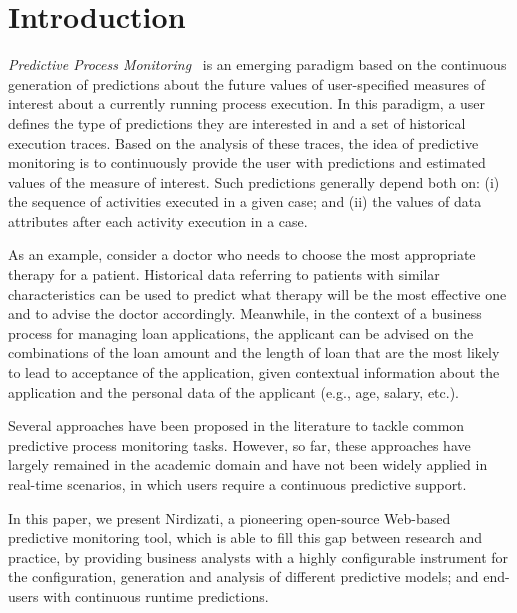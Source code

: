 \documentclass[runningheads,a4paper]{llncs}
\begin{document}
\section{Introduction} \label{sec:intro}
\emph{Predictive Process Monitoring}~\cite{PredictiveMonitoring} is an emerging paradigm based on the continuous generation of predictions about the future values of user-specified measures of interest about a currently running process execution.
In this paradigm, a user defines the type of predictions they are interested in and a set of historical execution traces. Based on the analysis of these traces, the idea of predictive monitoring is to continuously provide the user with predictions and estimated values of the measure of interest. Such predictions generally depend both on: (i) the sequence of activities executed in a given case; and (ii) the values of data attributes after each activity execution in a case.

As an example, consider a doctor who needs to choose the most appropriate therapy for a patient. Historical data referring to patients with similar characteristics can be used to predict what therapy will be the most effective one and to advise the doctor accordingly. Meanwhile, in the context of a business process for managing loan applications, the applicant can be advised on the combinations of the loan amount and the length of loan that are the most likely to lead to acceptance of the application, given contextual information about the application and the personal data of the applicant (e.g., age, salary, etc.).

Several approaches have been proposed in the literature to tackle common predictive process monitoring tasks.
However, so far, these approaches have largely remained in the academic domain and
have not been widely applied in real-time scenarios, in which users require a continuous predictive support.

In this paper, we present Nirdizati, a pioneering open-source Web-based predictive monitoring tool, which is able to fill this gap
between research and practice, by providing business analysts with a highly configurable instrument for the configuration,
generation and analysis of different predictive models; and end-users with continuous runtime predictions.
\end{document}
